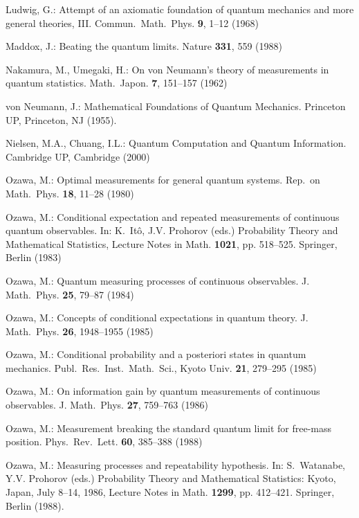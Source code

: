 \documentclass[12pt]{article}
\begin{document}
\begin{thebibliography}{10}
Ludwig, G.: Attempt of an axiomatic foundation of quantum mechanics and more
  general theories, {III}.
\newblock Commun.\ Math.\ Phys. \textbf{{9}}, {1--12} (1968)

Maddox, J.: Beating the quantum limits.
\newblock Nature \textbf{{331}}, 559 (1988)

Nakamura, M., Umegaki, H.: On von {Neumann}'s theory of measurements in quantum
  statistics.
\newblock Math.\ Japon. \textbf{{7}}, 151--157 (1962)

von {Neumann}, J.: {Mathematical Foundations of Quantum Mechanics}.
\newblock Princeton UP, Princeton, NJ (1955).

Nielsen, M.A., Chuang, I.L.: Quantum Computation and Quantum Information.
\newblock Cambridge UP, Cambridge (2000)

Ozawa, M.: Optimal measurements for general quantum systems.
\newblock Rep.\ on Math.\ Phys. \textbf{{18}}, 11--28 (1980)

Ozawa, M.: Conditional expectation and repeated measurements of continuous
  quantum observables.
\newblock In: K.~It\^{o}, J.V. Prohorov (eds.) Probability Theory and
  Mathematical Statistics, {\rm Lecture Notes in Math.} {\bf 1021}, pp.
  518--525. Springer, Berlin (1983)

Ozawa, M.: Quantum measuring processes of continuous observables.
\newblock J. Math.\ Phys. \textbf{{25}}, 79--87 (1984)

Ozawa, M.: Concepts of conditional expectations in quantum theory.
\newblock J. Math.\ Phys. \textbf{{26}}, 1948--1955 (1985)

Ozawa, M.: Conditional probability and a posteriori states in quantum
  mechanics.
\newblock Publ.\ Res.\ Inst.\ Math.\ Sci., Kyoto Univ. \textbf{{21}}, 279--295
  (1985)

Ozawa, M.: On information gain by quantum measurements of continuous
  observables.
\newblock J. Math.\ Phys. \textbf{{27}}, 759--763 (1986)

Ozawa, M.: Measurement breaking the standard quantum limit for free-mass
  position.
\newblock Phys.\ Rev.\ Lett. \textbf{{60}}, 385--388 (1988)

Ozawa, M.: Measuring processes and repeatability hypothesis.
\newblock In: S.~Watanabe, Y.V. Prohorov (eds.) Probability Theory and
  Mathematical Statistics: Kyoto, Japan, July 8--14, 1986, Lecture Notes in
  Math. {\bf 1299}, pp. 412--421. Springer, Berlin (1988).


\end{thebibliography}
\end{document}
